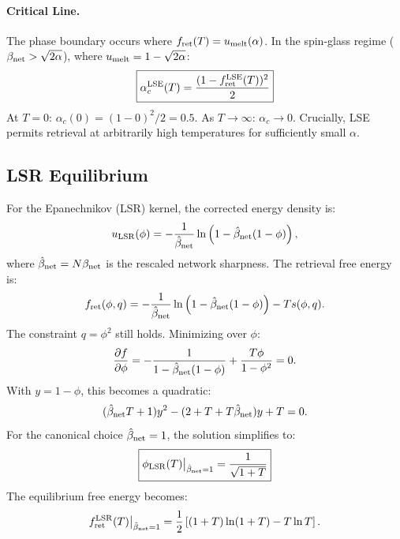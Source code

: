 \documentclass{article}
\theoremstyle{plain}
\theoremstyle{definition}
\theoremstyle{remark}
\begin{document}
\paragraph{Critical Line.} The phase boundary occurs where $f_{\rm ret}(T) = u_{\rm melt}(\alpha)$. In the spin-glass regime ($\beta_{\rm net} > \sqrt{2\alpha}$), where $u_{\rm melt} = 1 - \sqrt{2\alpha}$:
\begin{equation}
    \boxed{\alpha_c^{\rm LSE}(T) = \frac{(1 - f_{\rm ret}^{\rm LSE}(T))^2}{2}}
    \label{eq:alpha_lse}
\end{equation}
At $T = 0$: $\alpha_c(0) = (1-0)^2/2 = 0.5$. As $T \to \infty$: $\alpha_c \to 0$. Crucially, LSE permits retrieval at arbitrarily high temperatures for sufficiently small $\alpha$.

\subsection{LSR Equilibrium}

For the Epanechnikov (LSR) kernel, the corrected energy density is:
\begin{equation}
    u_{\rm LSR}(\phi) = -\frac{1}{\hat{\beta}_{\rm net}} \ln\left(1 - \hat{\beta}_{\rm net}(1-\phi)\right),
\end{equation}
where $\hat{\beta}_{\rm net} = N\beta_{\rm net}$ is the rescaled network sharpness. The retrieval free energy is:
\begin{equation}
    f_{\rm ret}(\phi, q) = -\frac{1}{\hat{\beta}_{\rm net}} \ln\left(1 - \hat{\beta}_{\rm net}(1-\phi)\right) - T s(\phi, q).
\end{equation}
The constraint $q = \phi^2$ still holds. Minimizing over $\phi$:
\begin{equation}
    \frac{\partial f}{\partial \phi} = -\frac{1}{1 - \hat{\beta}_{\rm net}(1-\phi)} + \frac{T\phi}{1-\phi^2} = 0.
\end{equation}
With $y = 1 - \phi$, this becomes a quadratic:
\begin{equation}
    (\hat{\beta}_{\rm net} T + 1)y^2 - (2 + T + T\hat{\beta}_{\rm net})y + T = 0.
    \label{eq:lsr_quadratic}
\end{equation}
For the canonical choice $\hat{\beta}_{\rm net} = 1$, the solution simplifies to:
\begin{equation}
    \boxed{\phi_{\rm LSR}(T)\big|_{\hat{\beta}_{\rm net}=1} = \frac{1}{\sqrt{1+T}}}
    \label{eq:phi_lsr}
\end{equation}
The equilibrium free energy becomes:
\begin{equation}
    f_{\rm ret}^{\rm LSR}(T)\big|_{\hat{\beta}_{\rm net}=1} = \frac{1}{2}\left[(1+T)\ln(1+T) - T\ln T\right].
    \label{eq:f_lsr}
\end{equation}
\end{document}
